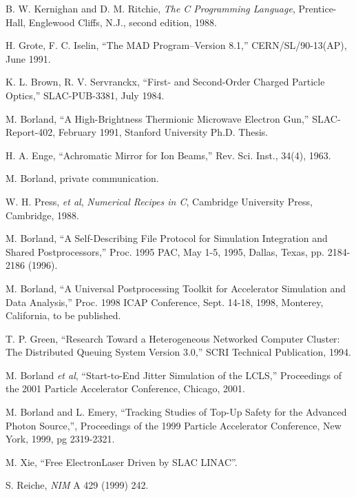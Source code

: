 \documentclass[11pt]{article}
\begin{document}
\newpage
\begin{thebibliography}{9}

    B. W. Kernighan and D. M. Ritchie, {\em The C Programming Language},
    Prentice-Hall, Englewood Cliffs, N.J., second edition, 1988.

    H. Grote, F. C. Iselin, ``The MAD Program--Version 8.1,'' CERN/SL/90-13(AP), June 1991.

    K. L. Brown, R. V. Servranckx, ``First- and Second-Order Charged Particle Optics,'' 
    SLAC-PUB-3381, July 1984.

    M. Borland, ``A High-Brightness Thermionic Microwave Electron Gun,'' SLAC-Report-402,
    February 1991, Stanford University Ph.D. Thesis.

    H. A. Enge, ``Achromatic Mirror for Ion Beams,'' Rev. Sci. Inst., 34(4), 1963.

    M. Borland, private communication.

    W. H. Press, {\em et al}, {\em Numerical Recipes in C}, Cambridge University
    Press, Cambridge, 1988.

M. Borland, ``A Self-Describing File Protocol for Simulation
Integration and Shared Postprocessors,'' Proc. 1995 PAC, May 1-5,
1995, Dallas, Texas, pp. 2184-2186 (1996).

M. Borland, ``A Universal Postprocessing Toolkit for Accelerator 
Simulation and Data Analysis,'' Proc. 1998 ICAP Conference, 
Sept. 14-18, 1998, Monterey, California, to be published.

 T. P. Green, ``Research Toward a Heterogeneous Networked
Computer Cluster: The Distributed Queuing System Version 3.0,'' SCRI
Technical Publication, 1994.

 M. Borland {\em et al}, ``Start-to-End Jitter Simulation
of the LCLS,'' Proceedings of the 2001 Particle Accelerator Conference,
Chicago, 2001.

 M. Borland and L. Emery, ``Tracking Studies of
Top-Up Safety for the Advanced Photon Source,'', Proceedings of the
1999 Particle Accelerator Conference, New York, 1999, pg 2319-2321.

 M. Xie, ``Free ElectronLaser Driven by SLAC
LINAC''.

 S. Reiche, {\em NIM} A 429 (1999) 242.

\end{thebibliography}
\end{document}
